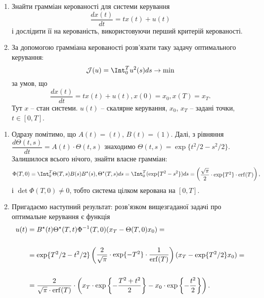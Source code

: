 \begin{problem}
\begin{enumerate}
    \item Знайти грамміан керованості для системи керування \[\dfrac{dx(t)}{dt} = tx(t) + u(t)\] і дослідити її на керованість, використовуючи перший критерій керованості.
    \item За допомогою грамміана керованості розв'язати таку задачу оптимального керування: \[\mathcal{J}(u) = \Int_0^T u^2(s) ds \to \min\]
    за умов, що \[\dfrac{dx(t)}{dt} = tx(t) + u(t), x(0) = x_0, x(T) = x_T. \]
    Тут $x$ -- стан системи. $u(t)$ -- скалярне керування, $x_0$, $x_T$ -- задані точки, $t\in[0,T]$.
\end{enumerate}

\end{problem}

\begin{solution}
\begin{enumerate}
    \item Одразу помітимо, що $A(t) = (t)$, $B(t) = (1)$. Далі, з рівняння $\dfrac{d\Theta(t,s)}{dt} = A(t) \cdot \Theta(t,s)$ знаходимо $\Theta(t,s) = \exp\{t^2 / 2 - s^2 / 2\}$. Залишилося всього нічого, знайти власне грамміан:
    \[ \Phi(T,0) = \Int_0^T \Theta(T,s)B(s)B^\star(s),\Theta^\star(T,s) ds = \Int_0^T (\exp\{T^2 - s^2\}) ds = \begin{pmatrix}\dfrac{\sqrt \pi}{2} \cdot \exp\{T^2\} \cdot \erf(T) \end{pmatrix}, \] і $\det\Phi(T,0)\ne0$, тобто система цілком керована на $[0, T]$.
    \item Пригадаємо наступний результат: розв'язком вищезгаданої задачі про оптимальне керування є функція
    \begin{align*}
        u(t) &= B^\star(t) \Theta^\star(T,t)\Phi^{-1}(T,0)(x_T-\Theta(T,0) x_0) = \\
        \\
        &= \exp\{T^2 / 2 - t^2 / 2\} \begin{pmatrix}\dfrac2{\sqrt \pi} \cdot \exp\{-T^2\} \cdot \dfrac1{\operatorname{erf}(T)} \end{pmatrix} (x_T - \exp\{T^2 / 2\} x_0) = \\
        \\
        &= \dfrac{2}{\sqrt{\pi}\cdot \operatorname{erf}(T)} \cdot \left(x_T \cdot \exp\left\{-\dfrac{T^2+t^2}2\right\} - x_0 \cdot \exp\left\{- \dfrac{t^2}2\right\}\right).
    \end{align*} 
\end{enumerate}
\end{solution} 

